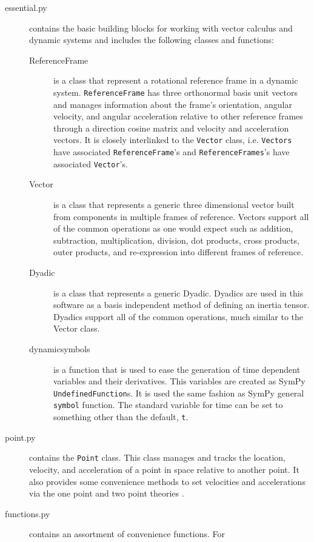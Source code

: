 \documentclass[twocolumn,10pt]{asme2e}
\begin{document}
\begin{description}
  \item[essential.py] contains the basic building blocks for working with
    vector calculus and dynamic systems and includes the following classes and
    functions:
    \begin{description}
      \item[ReferenceFrame] is a class that represent a rotational reference
        frame in a dynamic system. \verb|ReferenceFrame| has three orthonormal
        basis unit vectors and manages information about the frame's
        orientation, angular velocity, and angular acceleration relative to
        other reference frames through a direction cosine matrix and velocity
        and acceleration vectors. It is closely interlinked to the
        \verb|Vector| class, i.e. \verb|Vectors| have associated
        \verb|ReferenceFrame|'s and \verb|ReferenceFrames|'s have associated
        \verb|Vector|'s.
      \item[Vector] is a class that represents a generic three dimensional
        vector built from components in multiple frames of reference. Vectors
        support all of the common operations as one would expect such as
        addition, subtraction, multiplication, division, dot products, cross
        products, outer products, and re-expression into different frames of
        reference.
      \item[Dyadic] is a class that represents a generic Dyadic. Dyadics are
        used in this software as a basis independent method of defining an
        inertia tensor. Dyadics support all of the common operations, much
        similar to the Vector class.
      \item[dynamicsymbols] is a function that is used to ease the generation
        of time dependent variables and their derivatives. This variables are
        created as SymPy \verb|UndefinedFunction|s. It is used the same fashion
        as SymPy general \verb|symbol| function. The standard variable for time
        can be set to something other than the default, \verb|t|.
    \end{description}
  \item[point.py] contains the \verb|Point| class. This class manages
    and tracks the location, velocity, and acceleration of a point in space
    relative to another point. It also provides some convenience methods to set
    velocities and accelerations via the one point and two point theories
    \cite{Kane1985}.
  \item[functions.py] contains an assortment of convenience functions. For

\end{description}
\end{document}
